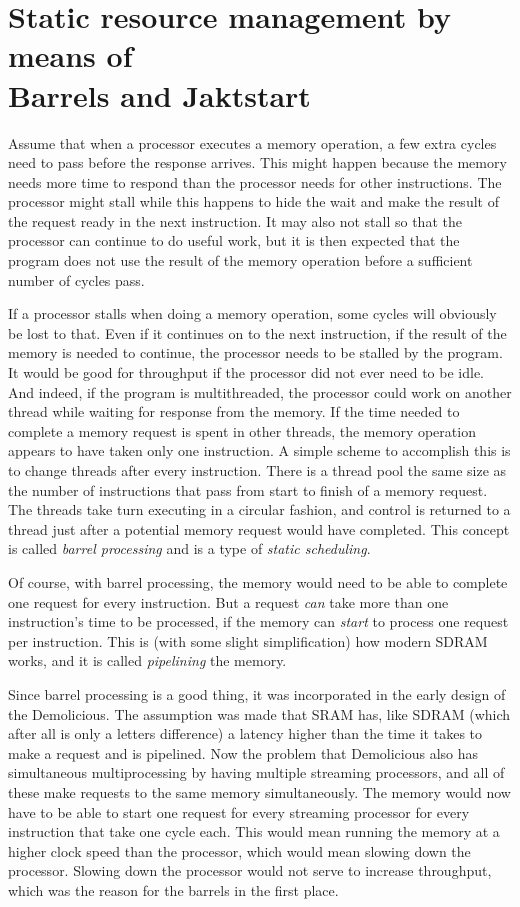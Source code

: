 \documentclass[../main/report.tex]{subfiles}
\begin{document}
\section{Static resource management by means of\\
Barrels and Jaktstart}

Assume that when a processor executes a memory operation, a few extra cycles need to pass before the response arrives.
This might happen because the memory needs more time to respond than the processor needs for other instructions.
The processor might stall while this happens to hide the wait and make the result of the request ready in the next instruction.
It may also not stall so that the processor can continue to do useful work, but it is then expected that the program does not use the result of the memory operation before a sufficient number of cycles pass.

If a processor stalls when doing a memory operation, some cycles will obviously be lost to that.
Even if it continues on to the next instruction, if the result of the memory is needed to continue, the processor needs to be stalled by the program.
It would be good for throughput if the processor did not ever need to be idle.
And indeed, if the program is multithreaded, the processor could work on another thread while waiting for response from the memory.
If the time needed to complete a memory request is spent in other threads, the memory operation appears to have taken only one instruction.
A simple scheme to accomplish this is to change threads after every instruction.
There is a thread pool the same size as the number of instructions that pass from start to finish of a memory request.
The threads take turn executing in a circular fashion, and control is returned to a thread just after a potential memory request would have completed.
This concept is called \emph{barrel processing} and is a type of \emph{static scheduling}.

Of course, with barrel processing, the memory would need to be able to complete one request for every instruction.
But a request \emph{can} take more than one instruction's time to be processed, if the memory can \emph{start} to process one request per instruction.
This is (with some slight simplification) how modern SDRAM works, and it is called \emph{pipelining} the memory.

Since barrel processing is a good thing\texttrademark, it was incorporated in the early design of the Demolicious.
The assumption was made that SRAM has, like SDRAM (which after all is only a letters difference) a latency higher than the time it takes to make a request and is pipelined.
Now the problem that Demolicious also has simultaneous multiprocessing by having multiple streaming processors, and all of these make requests to the same memory simultaneously.
The memory would now have to be able to start one request for every streaming processor for every instruction that take one cycle each.
This would mean running the memory at a higher clock speed than the processor, which would mean slowing down the processor.
Slowing down the processor would not serve to increase throughput, which was the reason for the barrels in the first place.
\end{document}
